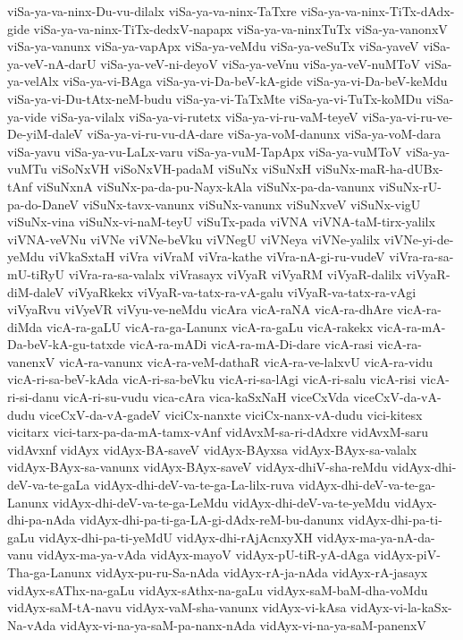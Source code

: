 {viSa-ya-va-ninx-Du-vu-dilalx
viSa-ya-va-ninx-TaTxre
viSa-ya-va-ninx-TiTx-dAdx-gide
viSa-ya-va-ninx-TiTx-dedxV-napapx
viSa-ya-va-ninxTuTx
viSa-ya-vanonxV
viSa-ya-vanunx
viSa-ya-vapApx
viSa-ya-veMdu
viSa-ya-veSuTx
viSa-yaveV
viSa-ya-veV-nA-darU
viSa-ya-veV-ni-deyoV
viSa-ya-veVnu
viSa-ya-veV-nuMToV
viSa-ya-velAlx
viSa-ya-vi-BAga
viSa-ya-vi-Da-beV-kA-gide
viSa-ya-vi-Da-beV-keMdu
viSa-ya-vi-Du-tAtx-neM-budu
viSa-ya-vi-TaTxMte
viSa-ya-vi-TuTx-koMDu
viSa-ya-vide
viSa-ya-vilalx
viSa-ya-vi-rutetx
viSa-ya-vi-ru-vaM-teyeV
viSa-ya-vi-ru-ve-De-yiM-daleV
viSa-ya-vi-ru-vu-dA-dare
viSa-ya-voM-danunx
viSa-ya-voM-dara
viSa-yavu
viSa-ya-vu-LaLx-varu
viSa-ya-vuM-TapApx
viSa-ya-vuMToV
viSa-ya-vuMTu
viSoNxVH
viSoNxVH-padaM
viSuNx
viSuNxH
viSuNx-maR-ha-dUBx-tAnf
viSuNxnA
viSuNx-pa-da-pu-Nayx-kAla
viSuNx-pa-da-vanunx
viSuNx-rU-pa-do-DaneV
viSuNx-tavx-vanunx
viSuNx-vanunx
viSuNxveV
viSuNx-vigU
viSuNx-vina
viSuNx-vi-naM-teyU
viSuTx-pada
viVNA
viVNA-taM-tirx-yalilx
viVNA-veVNu
viVNe
viVNe-beVku
viVNegU
viVNeya
viVNe-yalilx
viVNe-yi-de-yeMdu
viVkaSxtaH
viVra
viVraM
viVra-kathe
viVra-nA-gi-ru-vudeV
viVra-ra-sa-mU-tiRyU
viVra-ra-sa-valalx
viVrasayx
viVyaR
viVyaRM
viVyaR-dalilx
viVyaR-diM-daleV
viVyaRkekx
viVyaR-va-tatx-ra-vA-galu
viVyaR-va-tatx-ra-vAgi
viVyaRvu
viVyeVR
viVyu-ve-neMdu
vicAra
vicA-raNA
vicA-ra-dhAre
vicA-ra-diMda
vicA-ra-gaLU
vicA-ra-ga-Lanunx
vicA-ra-gaLu
vicA-rakekx
vicA-ra-mA-Da-beV-kA-gu-tatxde
vicA-ra-mADi
vicA-ra-mA-Di-dare
vicA-rasi
vicA-ra-vanenxV
vicA-ra-vanunx
vicA-ra-veM-dathaR
vicA-ra-ve-lalxvU
vicA-ra-vidu
vicA-ri-sa-beV-kAda
vicA-ri-sa-beVku
vicA-ri-sa-lAgi
vicA-ri-salu
vicA-risi
vicA-ri-si-danu
vicA-ri-su-vudu
vica-cAra
vica-kaSxNaH
viceCxVda
viceCxV-da-vA-dudu
viceCxV-da-vA-gadeV
viciCx-nanxte
viciCx-nanx-vA-dudu
vici-kitesx
vicitarx
vici-tarx-pa-da-mA-tamx-vAnf
vidAvxM-sa-ri-dAdxre
vidAvxM-saru
vidAvxnf
vidAyx
vidAyx-BA-saveV
vidAyx-BAyxsa
vidAyx-BAyx-sa-valalx
vidAyx-BAyx-sa-vanunx
vidAyx-BAyx-saveV
vidAyx-dhiV-sha-reMdu
vidAyx-dhi-deV-va-te-gaLa
vidAyx-dhi-deV-va-te-ga-La-lilx-ruva
vidAyx-dhi-deV-va-te-ga-Lanunx
vidAyx-dhi-deV-va-te-ga-LeMdu
vidAyx-dhi-deV-va-te-yeMdu
vidAyx-dhi-pa-nAda
vidAyx-dhi-pa-ti-ga-LA-gi-dAdx-reM-bu-danunx
vidAyx-dhi-pa-ti-gaLu
vidAyx-dhi-pa-ti-yeMdU
vidAyx-dhi-rAjAcnxyXH
vidAyx-ma-ya-nA-da-vanu
vidAyx-ma-ya-vAda
vidAyx-mayoV
vidAyx-pU-tiR-yA-dAga
vidAyx-piV-Tha-ga-Lanunx
vidAyx-pu-ru-Sa-nAda
vidAyx-rA-ja-nAda
vidAyx-rA-jasayx
vidAyx-sAThx-na-gaLu
vidAyx-sAthx-na-gaLu
vidAyx-saM-baM-dha-voMdu
vidAyx-saM-tA-navu
vidAyx-vaM-sha-vanunx
vidAyx-vi-kAsa
vidAyx-vi-la-kaSx-Na-vAda
vidAyx-vi-na-ya-saM-pa-nanx-nAda
vidAyx-vi-na-ya-saM-panenxV
}
